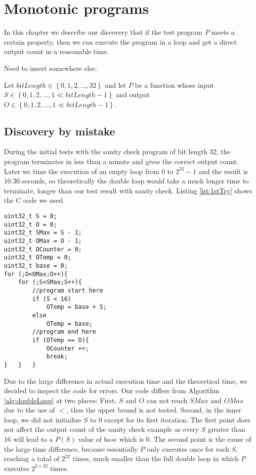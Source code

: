 \chapter{Monotonic programs}
	\label{CH_03}

In this chapter we describe our discovery that if the test program $P$ meets a certain property, then we can execute the program in a loop and get a direct output count in a reasonable time.

Need to insert somewhere else.

\begin{mydef}
Let $bitLength\in \left\{ {0,1,2,..., 32}\right\}$ and let $P$ be a function whose input $S \in \left\{ {0,1,2,..., 1\ll bitLength-1}\right\}$ and output $O \in \left\{ {0,1,2,..., 1\ll bitLength-1}\right\}$.
\end{mydef}

\section{Discovery by mistake}
During the initial tests with the sanity check program of bit length 32, the program terminates in less than a minute and gives the correct output count. Later we time the execution of an empty loop from $0$ to $2^{32} - 1$ and the result is $10.30$ seconds, so theoretically the double loop would take a much longer time to terminate, longer than our test result with sanity check.  Listing \ref{lst:1stTry} shows the C code we used.

\lstset{language=C}  
\begin{lstlisting}[caption={Initial implementation of the double loop with sanity check in C.},label=lst:1stTry]
uint32_t S = 0;
uint32_t O = 0;
uint32_t SMax = S - 1;
uint32_t OMax = O - 1;
uint32_t OCounter = 0;
uint32_t OTemp = 0;
uint32_t base = 0;
for (;O<OMax;O++){
	for (;S<SMax;S++){
		//program start here
		if (S < 16)
			OTemp = base + S;
		else
			OTemp = base;
		//program end here
		if (OTemp == O){
			OCounter ++;
			break;
}	}	}
\end{lstlisting}

Due to the large difference in actual execution time and the theoretical time, we decided to inspect the code for errors. Our code differs from Algorithm \ref{alg:doubleLoop} at two places: First, $S$ and $O$ can not reach $SMax$ and $OMax$ due to the use of $<$, thus the upper bound is not tested. Second, in the inner loop, we did not initialize $S$ to $0$ except for its first iteration. The first point does not affect the output count of the sanity check example as every $S$ greater than $16$ will lead to a $P(S)$ value of $base$ which is $0$. The second point is the cause of the large time difference, because essentially $P$ only executes once for each $S$, reaching a total of $2^{32}$ times, much smaller than the full double loop in which $P$ executes $2^{2 \times 32}$ times.

